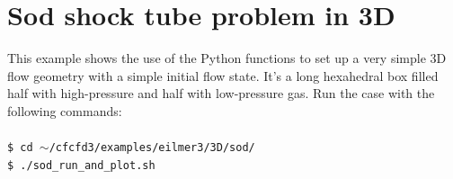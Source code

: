 
\section{Sod shock tube problem in 3D}
%
This example shows the use of the Python functions to set up
a very simple 3D flow geometry with a simple initial flow state.
It's a long hexahedral box filled half with high-pressure and half with
low-pressure gas. Run the case with the following commands:\\
%
\topbar\\
\texttt{\$ cd $\sim$/cfcfd3/examples/eilmer3/3D/sod/}\\
\texttt{\$ ./sod\_run\_and\_plot.sh}\\
\bottombar\\
%

